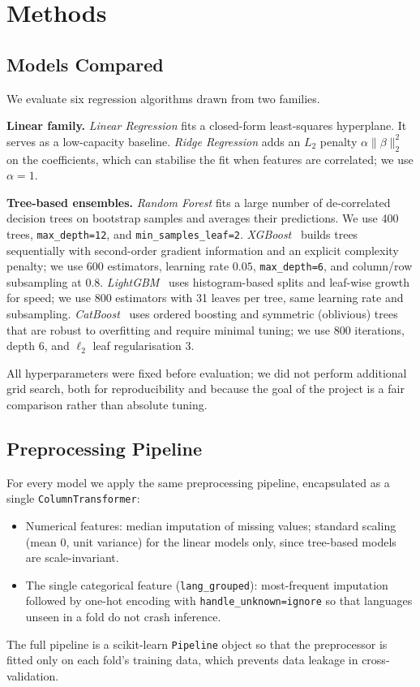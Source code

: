 \documentclass[10pt,a4paper]{article}
\begin{document}
\section{Methods}

\subsection{Models Compared}

We evaluate six regression algorithms drawn from two families.

\textbf{Linear family.}
\textit{Linear Regression} fits a closed-form least-squares hyperplane. It serves
as a low-capacity baseline. \textit{Ridge Regression} adds an
$L_{2}$ penalty $\alpha\|\beta\|_{2}^{2}$ on the coefficients, which can stabilise
the fit when features are correlated; we use $\alpha=1$.

\textbf{Tree-based ensembles.}
\textit{Random Forest} fits a large number of de-correlated decision trees on
bootstrap samples and averages their predictions. We use 400 trees,
\texttt{max\_depth=12}, and \texttt{min\_samples\_leaf=2}.
\textit{XGBoost}~\cite{xgboost} builds trees sequentially with second-order
gradient information and an explicit complexity penalty; we use 600 estimators,
learning rate $0.05$, \texttt{max\_depth=6}, and column/row subsampling at $0.8$.
\textit{LightGBM}~\cite{lightgbm} uses histogram-based splits and leaf-wise growth
for speed; we use 800 estimators with 31 leaves per tree, same learning rate
and subsampling. \textit{CatBoost}~\cite{catboost} uses ordered boosting and
symmetric (oblivious) trees that are robust to overfitting and require minimal
tuning; we use 800 iterations, depth 6, and $\ell_{2}$ leaf regularisation 3.

All hyperparameters were fixed before evaluation; we did not perform additional
grid search, both for reproducibility and because the goal of the project is a
fair comparison rather than absolute tuning.

\subsection{Preprocessing Pipeline}

For every model we apply the same preprocessing pipeline, encapsulated as a
single \texttt{ColumnTransformer}:
\begin{itemize}
    \item Numerical features: median imputation of missing values; standard
          scaling (mean 0, unit variance) for the linear models only, since
          tree-based models are scale-invariant.
    \item The single categorical feature (\texttt{lang\_grouped}): most-frequent
          imputation followed by one-hot encoding with
          \texttt{handle\_unknown=ignore} so that languages unseen in a fold do
          not crash inference.
\end{itemize}
The full pipeline is a scikit-learn \texttt{Pipeline} object so that the
preprocessor is fitted only on each fold's training data, which prevents
data leakage in cross-validation.
\end{document}
